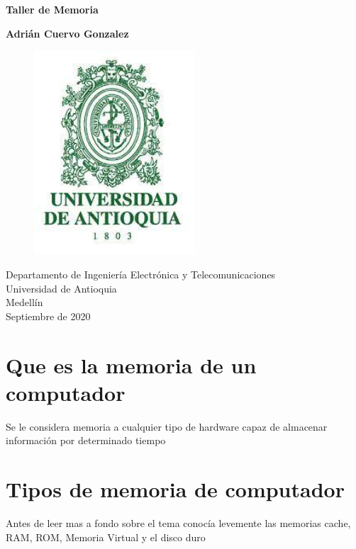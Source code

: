 \documentclass{article}
\begin{document}
	
	\begin{titlepage}
		\begin{center}
			\vspace*{1cm}
			
			\Huge
			\textbf{Taller de Memoria}
			
			\vspace{0.5cm}
			\LARGE
			
			\vspace{1.5cm}
			
			\textbf{Adrián Cuervo Gonzalez}
			\vfill
			\begin{figure}[h]
				\includegraphics[width=6cm]{Images/EscudoUdeA.jpg}
				\centering
				\label{fig:EscudoUdeA}
			\end{figure}
			
			\vspace{0.8cm}
			
			\Large
			Departamento de Ingeniería Electrónica y Telecomunicaciones\\
			Universidad de Antioquia\\
			Medellín\\
			Septiembre de 2020
			
		\end{center}
	\end{titlepage}

	
	\tableofcontents
	\newpage
	\section{Que es la memoria de un computador}\label{intro}
	Se le considera memoria a cualquier tipo de hardware capaz de almacenar información por determinado tiempo
	
	\section{Tipos de memoria de computador} \label{contenido}
	Antes de leer mas a fondo sobre el tema conocía levemente las memorias cache, RAM, ROM, Memoria Virtual y el disco duro
\end{document}
